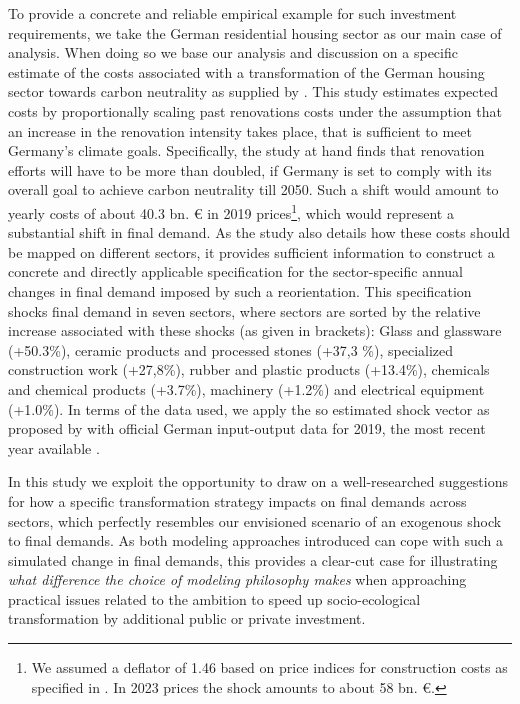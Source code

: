 \documentclass{article}
\begin{document}
To provide a concrete and reliable empirical example for such investment requirements, we take the German residential housing sector as our main case of analysis. When doing so we base our analysis and discussion on a specific estimate of the costs associated with a transformation of the German housing sector towards carbon neutrality as supplied by \citet{Hornykewycz.2025}. This study estimates expected costs by proportionally scaling past renovations costs under the assumption that an increase in the renovation intensity takes place, that is sufficient to meet Germany's climate goals. Specifically, the study at hand finds that renovation efforts will have to be more than doubled, if Germany is set to comply with its overall goal to achieve carbon neutrality till 2050. Such a shift would amount to yearly costs of about 40.3 bn. € in 2019 prices\footnote{We assumed a deflator of 1.46 based on price indices for construction costs as specified in \citet{Hornykewycz.2025}. In 2023 prices the shock amounts to about 58 bn. €.}, which would represent a substantial shift in final demand. As the study also details how these costs should be mapped on different sectors, it provides sufficient information to construct a concrete and directly applicable specification for the sector-specific annual changes in final demand imposed by such a reorientation. This specification shocks final demand in seven sectors, where sectors are sorted by the relative increase associated with these shocks (as given in brackets): 
Glass and glassware (+50.3\%), ceramic products and processed stones (+37,3 \%), specialized construction work (+27,8\%), rubber and plastic products (+13.4\%), chemicals and chemical products (+3.7\%), machinery (+1.2\%) and electrical equipment (+1.0\%).
In terms of the data used, we apply the so estimated shock vector as proposed by \citet{Hornykewycz.2025} with official German input-output data for 2019, the most recent year available \citep[see][]{IOTabelle}.

In this study we exploit the opportunity to draw on a well-researched suggestions for how a specific transformation strategy impacts on final demands across sectors, which perfectly resembles our envisioned scenario of an exogenous shock to final demands. As both modeling approaches introduced can cope with such a simulated change in final demands, this provides a clear-cut case for illustrating \textit{what difference the choice of modeling philosophy makes} when approaching practical issues related to the ambition to speed up socio-ecological transformation by additional public or private investment.
\end{document}
